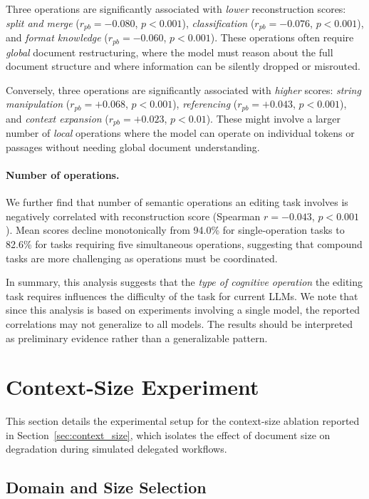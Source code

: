 \documentclass{article} %
\begin{document}
Three operations are significantly associated with \textit{lower} reconstruction scores: \textit{split and merge} ($r_{pb} = {-}0.080$, $p < 0.001$), \textit{classification} ($r_{pb} = {-}0.076$, $p < 0.001$), and \textit{format knowledge} ($r_{pb} = {-}0.060$, $p < 0.001$). These operations often require \textit{global} document restructuring, where the model must reason about the full document structure and where information can be silently dropped or misrouted.

Conversely, three operations are significantly associated with \textit{higher} scores: \textit{string manipulation} ($r_{pb} = {+}0.068$, $p < 0.001$), \textit{referencing} ($r_{pb} = {+}0.043$, $p < 0.001$), and \textit{context expansion} ($r_{pb} = {+}0.023$, $p < 0.01$). These might involve a larger number of \textit{local} operations where the model can operate on individual tokens or passages without needing global document understanding.

\paragraph{Number of operations.} We further find that number of semantic operations an editing task involves is negatively correlated with reconstruction score (Spearman $r = {-}0.043$, $p < 0.001$). Mean scores decline monotonically from 94.0\% for single-operation tasks to 82.6\% for tasks requiring five simultaneous operations, suggesting that compound tasks are more challenging as operations must be coordinated.

In summary, this analysis suggests that the \textit{type of cognitive operation} the editing task requires influences the difficulty of the task for current LLMs. We note that since this analysis is based on experiments involving a single model, the reported correlations may not generalize to all models. The results should be interpreted as preliminary evidence rather than a generalizable pattern.

\section{Context-Size Experiment} \label{app:context_size_exp}

This section details the experimental setup for the context-size ablation reported in Section~\ref{sec:context_size}, which isolates the effect of document size on degradation during simulated delegated workflows.

\subsection{Domain and Size Selection}
\end{document}

